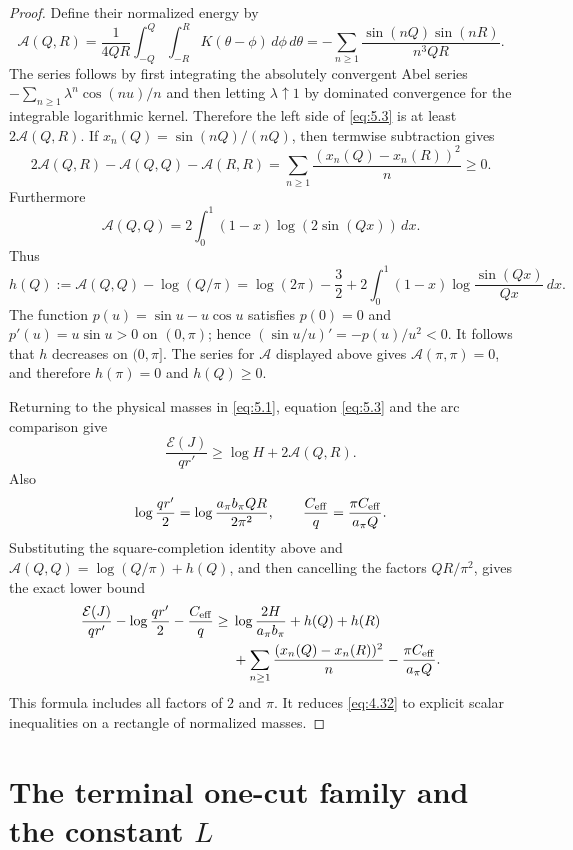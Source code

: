 \documentclass[11pt]{article}
\numberwithin{equation}{section}
\theoremstyle{plain}
\theoremstyle{definition}
\theoremstyle{remark}
\newcommand{\1}{\mathbf 1}
\newcommand{\dd}{\,d}
\newcommand{\cA}{\mathcal A}
\newcommand{\E}{\mathcal E}
\begin{document}
\begin{proof}
Define their normalized energy by
\[
 \cA(Q,R)=\frac1{4QR}\int_{-Q}^Q\int_{-R}^R
 K(\theta-\phi)\dd\phi\dd\theta
 =-\sum_{n\ge1}
 \frac{\sin(nQ)\sin(nR)}{n^3QR}.
\]
The series follows by first integrating the absolutely convergent Abel
series $-\sum_{n\ge1}\lambda^n\cos(nu)/n$ and then letting
$\lambda\uparrow1$ by dominated convergence for the integrable logarithmic
kernel.  Therefore the left side of \eqref{eq:5.3} is at
least $2\cA(Q,R)$.  If $x_n(Q)=\sin(nQ)/(nQ)$, then termwise subtraction
gives
\[
 2\cA(Q,R)-\cA(Q,Q)-\cA(R,R)
 =\sum_{n\ge1}\frac{(x_n(Q)-x_n(R))^2}{n}\ge0.
\]
Furthermore
\[
 \cA(Q,Q)=2\int_0^1(1-x)\log(2\sin(Qx))\dd x.
\]
Thus
\[
 h(Q):=\cA(Q,Q)-\log(Q/\pi)
 =\log(2\pi)-\frac32
 +2\int_0^1(1-x)\log\frac{\sin(Qx)}{Qx}\dd x.
\]
The function $p(u)=\sin u-u\cos u$ satisfies $p(0)=0$ and
$p'(u)=u\sin u>0$ on $(0,\pi)$; hence
$(\sin u/u)'=-p(u)/u^2<0$.  It follows that $h$ decreases on
$(0,\pi]$.  The series for $\cA$ displayed above gives $\cA(\pi,\pi)=0$, and therefore
$h(\pi)=0$ and $h(Q)\ge0$.

Returning to the physical masses in \eqref{eq:5.1}, equation \eqref{eq:5.3} and the arc
comparison give
\[
 \frac{\E(J)}{qr'}\ge \log H+2\cA(Q,R).
\]
Also
\[
 \log\frac{qr'}2
 =\log\frac{a_\pi b_\pi QR}{2\pi^2},
 \qquad
 \frac{C_{\rm eff}}q=\frac{\pi C_{\rm eff}}{a_\pi Q}.
\]
Substituting the square-completion identity above and
$\cA(Q,Q)=\log(Q/\pi)+h(Q)$, and then cancelling the factors
$QR/\pi^2$, gives the exact lower bound
\begin{align}
\frac{\E(J)}{qr'}-\log\frac{qr'}2-\frac{C_{\rm eff}}q
\ge{}&\log\frac{2H}{a_\pi b_\pi}+h(Q)+h(R)\\
&+\sum_{n\ge1}\frac{(x_n(Q)-x_n(R))^2}{n}
-\frac{\pi C_{\rm eff}}{a_\pi Q}.
\label{eq:5.7}
\end{align}
This formula includes all factors of $2$ and $\pi$.  It reduces \eqref{eq:4.32} to
explicit scalar inequalities on a rectangle of normalized masses.
\end{proof}

\section{The terminal one-cut family and the constant
\texorpdfstring{$L$}{L}}\label{sec:onecut}
\end{document}
